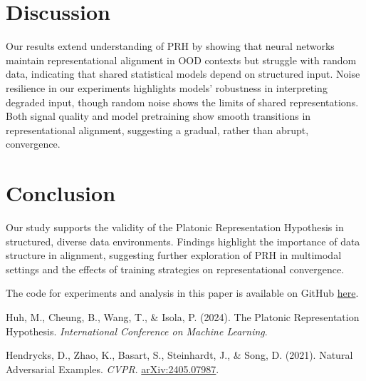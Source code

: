 \documentclass[10pt,a4paper]{article}
\begin{document}
\section{Discussion}
Our results extend understanding of PRH by showing that neural networks maintain representational alignment in OOD contexts but struggle with random data, indicating that shared statistical models depend on structured input. Noise resilience in our experiments highlights models' robustness in interpreting degraded input, though random noise shows the limits of shared representations. Both signal quality and model pretraining show smooth transitions in representational alignment, suggesting a gradual, rather than abrupt, convergence.

\section{Conclusion}
Our study supports the validity of the Platonic Representation Hypothesis in structured, diverse data environments. Findings highlight the importance of data structure in alignment, suggesting further exploration of PRH in multimodal settings and the effects of training strategies on representational convergence.

\vfill
The code for experiments and analysis in this paper is available on GitHub \href{https://github.com/rokosbasilisk/prh-experiments}{here}.


\begin{thebibliography}{9}

Huh, M., Cheung, B., Wang, T., \& Isola, P. (2024). The Platonic Representation Hypothesis. \emph{International Conference on Machine Learning}.

Hendrycks, D., Zhao, K., Basart, S., Steinhardt, J., \& Song, D. (2021). Natural Adversarial Examples. \emph{CVPR}. \href{https://arxiv.org/abs/2405.07987}{arXiv:2405.07987}.

\end{thebibliography}
\end{document}
